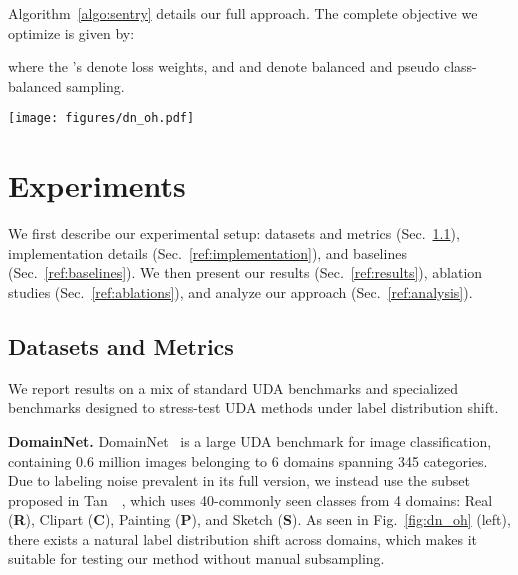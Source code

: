 \documentclass[10pt,twocolumn,letterpaper]{article}
\begin{document}
Algorithm~\ref{algo:sentry} details our full approach. The complete objective we optimize is given by:

\vspace{-10pt}


\noindent where the 's denote loss weights, and  and  denote balanced and pseudo class-balanced sampling. \begin{figure*}[t]
    \centering
    \vspace{-3pt}
    \texttt{[image: figures/dn\_oh.pdf]}
    \vspace*{-17pt}
    \caption{
    \textbf{Left}: Natural label distribution shift (LDS) on the ClipartSketch shift from DomainNet. \textbf{Right:} Manually generated LDS on the Real WorldClipart shift from OfficeHome RS-UT~\cite{tan2019generalized}.
    }
    \vspace*{-7pt}
    \label{fig:dn_oh}
 \end{figure*}

 \vspace{-10pt}
\section{Experiments}
\label{sec:experiments}
\vspace{-5pt}

\par\noindent We first describe our experimental setup: datasets and metrics (Sec.~\ref{ref:datasets}), implementation details (Sec.~\ref{ref:implementation}), and baselines (Sec.~\ref{ref:baselines}). We then present our results (Sec.~\ref{ref:results}), ablation studies (Sec.~\ref{ref:ablations}), and analyze our approach (Sec.~\ref{ref:analysis}).

\vspace{-5pt}
\subsection{Datasets and Metrics}
\label{ref:datasets}
\vspace{-5pt}

\par\noindent We report results on a mix of standard UDA benchmarks and specialized benchmarks designed to stress-test UDA methods under label distribution shift.

\par\noindent\textbf{DomainNet.} DomainNet~\cite{peng2019moment} is a large UDA benchmark for image classification, containing 0.6 million images belonging to 6 domains spanning 345 categories. Due to labeling noise prevalent in its full version, we instead use the subset proposed in Tan~\etal~\cite{tan2019generalized}, which uses 40-commonly seen classes from 4 domains: Real (\textbf{R}), Clipart (\textbf{C}), Painting (\textbf{P}), and Sketch (\textbf{S}). As seen in Fig.~\ref{fig:dn_oh} (left), there exists a natural label distribution shift across domains, which makes it suitable for testing our method without manual subsampling.
\end{document}
